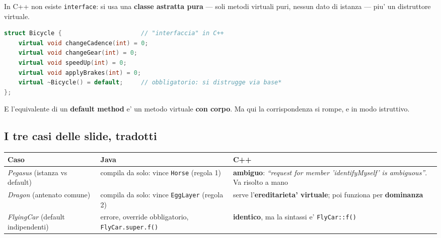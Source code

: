 \documentclass{report}
\newcommand{\code}[1]{\texttt{\small #1}}
\begin{document}
In C++ non esiste \code{interface}: si usa una \textbf{classe astratta
pura} --- soli metodi virtuali puri, nessun dato di istanza --- piu' un
distruttore virtuale.

\begin{lstlisting}[language=C++]
struct Bicycle {                      // "interfaccia" in C++
    virtual void changeCadence(int) = 0;
    virtual void changeGear(int) = 0;
    virtual void speedUp(int) = 0;
    virtual void applyBrakes(int) = 0;
    virtual ~Bicycle() = default;     // obbligatorio: si distrugge via base*
};
\end{lstlisting}

E l'equivalente di un \textbf{default method} e' un metodo virtuale
\textbf{con corpo}. Ma qui la corrispondenza si rompe, e in modo
istruttivo.


\subsection{I tre casi delle slide, tradotti}

\begin{center}
\renewcommand{\arraystretch}{1.35}
\setlength{\tabcolsep}{4pt}
\footnotesize
\begin{tabular}{|>{\raggedright\arraybackslash}p{2.3cm}|>{\raggedright\arraybackslash}p{5.0cm}|>{\raggedright\arraybackslash}p{5.0cm}|}
\hline
\textbf{Caso} & \textbf{Java} & \textbf{C++} \\
\hline
\emph{Pegasus} (istanza vs default) & compila da solo: vince \code{Horse} (regola 1) & \textbf{ambiguo}: \emph{``request for member 'identifyMyself' is ambiguous''}. Va risolto a mano \\
\hline
\emph{Dragon} (antenato comune) & compila da solo: vince \code{EggLayer} (regola 2) & serve l'\textbf{ereditarieta' virtuale}; poi funziona per \textbf{dominanza} \\
\hline
\emph{FlyingCar} (default indipendenti) & errore, override obbligatorio, \code{FlyCar.super.f()} & \textbf{identico}, ma la sintassi e' \code{FlyCar::f()} \\
\hline
\end{tabular}
\end{center}
\end{document}
